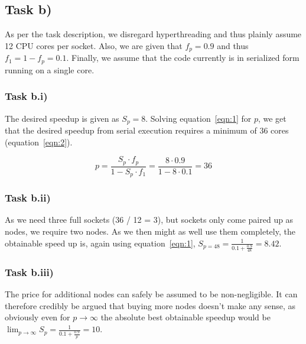 \documentclass[11pt,a4paper]{article}
\begin{document}
\subsection{Task b)}
As per the task description, we disregard hyperthreading and thus plainly assume 12 CPU cores per socket. Also, we are given that 
$f_p = 0.9$ and thus $f_1 = 1 - f_p = 0.1$. Finally, we assume that the code currently is in serialized form running on a single core.

\subsubsection{Task b.i)}
The desired speedup is given as $S_p = 8$. Solving equation~\ref{eqn:1} for $p$, 
we get that the desired speedup from serial execution requires a minimum of 36 cores (equation~\ref{eqn:2}).

\begin{equation}
    p = \frac{S_p \cdot f_p}{1 - S_p \cdot f_1 } = \frac{8 \cdot 0.9}{1 - 8 \cdot 0.1} = 36
\label{eqn:2}
\end{equation}

\subsubsection{Task b.ii)}
As we need three full sockets (36 / 12 = 3), but sockets only come paired up as nodes, we require two nodes. As we then might as well
use them completely, the obtainable speed up is, again using equation~\ref{eqn:1}, $S_{p=48} = \frac{1}{0.1 + \frac{0.9}{48}} = 8.42$.

\subsubsection{Task b.iii)}
The price for additional nodes can safely be assumed to be non-negligible. It can therefore credibly be argued that buying more nodes doesn't 
make any sense, as obviously even for $p \rightarrow \infty$ the absolute best obtainable speedup would be
 $\lim_{p \rightarrow \infty} S_p = \frac{1}{0.1 + \frac{0.9}{p}} = 10$.

\end{document}
